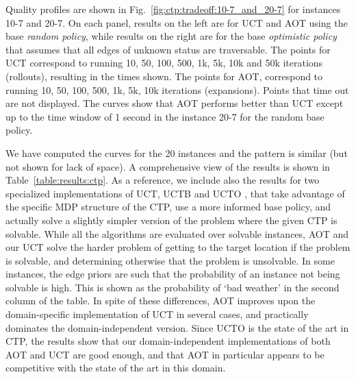 \documentclass[letterpaper]{article}
\newcommand{\Omit}[1]{}
\begin{document}
Quality profiles are shown in Fig.~\ref{fig:ctp:tradeoff:10-7_and_20-7}
for instances 10-7 and 20-7.
On each panel, results on the left are for UCT and AOT using the base
\emph{random policy}, while results on the right are for the base \emph{optimistic policy}
that assumes that  all edges of unknown status are traversable.
The points for  UCT correspond to running 10, 50, 100, 500, 1k, 5k, 10k and 50k iterations (rollouts),
resulting in the times shown. The points for  AOT, correspond to running  10, 50, 100, 500, 1k, 5k, 10k iterations (expansions).
Points that time out are not displayed. %
The curves show  that AOT  performs better than  UCT
except up to the time window of 1 second in  the instance 20-7 for the random base policy.
\Omit{
window where AOT takes over. The first points for AOT appear later in time that the first ones
for UCT because while 10 iterations of UCT introduce at most 10 nodes in the graph,
10 iterations of AOT introduce up to $|A||S|$ nodes, where $A$ and $S$ are the number of
actions and states. The curves show however  that the more expensive expansions in AOT
can pay off.}
We have computed the curves for the 20 instances and the pattern is similar (but not shown for lack of space).
A comprehensive view of the results  is shown in Table~\ref{table:results:ctp}.
As a reference, we include also  the results for  two specialized implementations of UCT,
UCTB and UCTO  \cite{malte:ctp}, that take advantage of the specific MDP structure of the CTP,
use a more informed base policy, and actually solve a slightly simpler version of the
problem where the given CTP is solvable. While all the algorithms are evaluated over
solvable instances, AOT and our UCT solve the harder problem of getting to the target
location if the problem is solvable, and determining otherwise that the problem is unsolvable.
In some instances, the edge  priors are such that the  probability of an instance not being solvable
is high. This is shown as the probability of `bad weather' in the second column of the table.
In spite of these differences, AOT improves upon the domain-specific implementation
of UCT in several  cases, and practically dominates the domain-independent version.
Since UCTO is the state of the art in CTP, the  results show that
our domain-independent implementations of both AOT and UCT
are good enough, and that AOT in particular appears to be
competitive with the state of the art in this domain.
\end{document}
